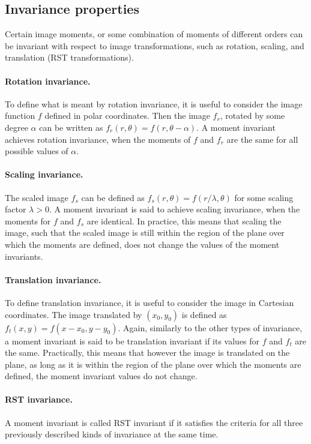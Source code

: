 \subsection{Invariance properties}
Certain image moments, or some combination of moments of different orders can be invariant with respect to image transformations, such as rotation, scaling, and translation (RST transformations).

\paragraph{Rotation invariance.} To define what is meant by rotation invariance, it is useful to consider the image function $f$ defined in polar coordinates. Then the image $f_{r}$, rotated by some degree $\alpha$ can be written as $f_{r}(r,\theta) = f(r,\theta - \alpha)$. A moment invariant achieves rotation invariance, when the moments of $f$ and $f_{r}$ are the same for all possible values of $\alpha$.   

\paragraph{Scaling invariance.} The scaled image $f_{s}$ can be defined as $f_{s}(r, \theta) = f(r / \lambda, \theta)$ for some scaling factor $\lambda > 0$. A moment invariant is said to achieve scaling invariance, when the moments for $f$ and $f_{s}$ are identical. In practice, this means that scaling the image, such that the scaled image is still within the region of the plane over which the moments are defined, does not change the values of the moment invariants.

\paragraph{Translation invariance.} To define translation invariance, it is useful to consider the image in Cartesian coordinates. The image translated by $(x_0, y_0)$ is defined as $f_{t}(x,y) = f(x - x_0, y - y_0)$. Again, similarly to the other types of invariance, a moment invariant is said to be translation invariant if its values for $f$ and $f_{t}$ are the same. Practically, this means that however the image is translated on the plane, as long as it is within the region of the plane over which the moments are defined, the moment invariant values do not change.

\paragraph{RST invariance.} A moment invariant is called RST invariant if it satisfies the criteria for all three previously described kinds of invariance at the same time. 


